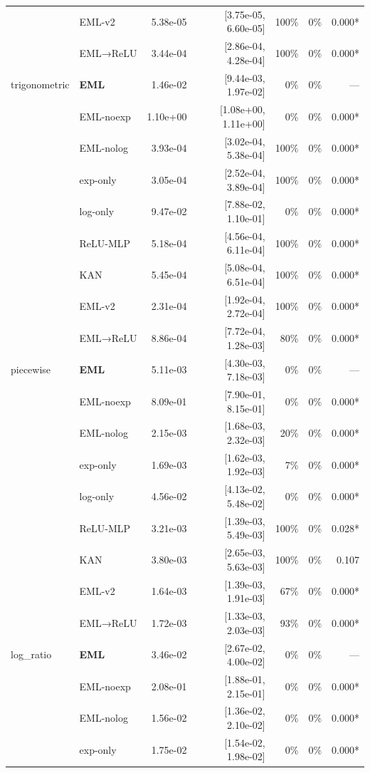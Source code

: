 \begin{table}[t]
\begin{tabular}{llrrrrr}
 & EML-v2 & 5.38e-05 & [3.75e-05, 6.60e-05] & 100\% & 0\% & 0.000* \\
 & EML→ReLU & 3.44e-04 & [2.86e-04, 4.28e-04] & 100\% & 0\% & 0.000* \\
\midrule
trigonometric & \textbf{EML} & 1.46e-02 & [9.44e-03, 1.97e-02] & 0\% & 0\% & — \\
 & EML-noexp & 1.10e+00 & [1.08e+00, 1.11e+00] & 0\% & 0\% & 0.000* \\
 & EML-nolog & 3.93e-04 & [3.02e-04, 5.38e-04] & 100\% & 0\% & 0.000* \\
 & exp-only & 3.05e-04 & [2.52e-04, 3.89e-04] & 100\% & 0\% & 0.000* \\
 & log-only & 9.47e-02 & [7.88e-02, 1.10e-01] & 0\% & 0\% & 0.000* \\
 & ReLU-MLP & 5.18e-04 & [4.56e-04, 6.11e-04] & 100\% & 0\% & 0.000* \\
 & KAN & 5.45e-04 & [5.08e-04, 6.51e-04] & 100\% & 0\% & 0.000* \\
 & EML-v2 & 2.31e-04 & [1.92e-04, 2.72e-04] & 100\% & 0\% & 0.000* \\
 & EML→ReLU & 8.86e-04 & [7.72e-04, 1.28e-03] & 80\% & 0\% & 0.000* \\
\midrule
piecewise & \textbf{EML} & 5.11e-03 & [4.30e-03, 7.18e-03] & 0\% & 0\% & — \\
 & EML-noexp & 8.09e-01 & [7.90e-01, 8.15e-01] & 0\% & 0\% & 0.000* \\
 & EML-nolog & 2.15e-03 & [1.68e-03, 2.32e-03] & 20\% & 0\% & 0.000* \\
 & exp-only & 1.69e-03 & [1.62e-03, 1.92e-03] & 7\% & 0\% & 0.000* \\
 & log-only & 4.56e-02 & [4.13e-02, 5.48e-02] & 0\% & 0\% & 0.000* \\
 & ReLU-MLP & 3.21e-03 & [1.39e-03, 5.49e-03] & 100\% & 0\% & 0.028* \\
 & KAN & 3.80e-03 & [2.65e-03, 5.63e-03] & 100\% & 0\% & 0.107 \\
 & EML-v2 & 1.64e-03 & [1.39e-03, 1.91e-03] & 67\% & 0\% & 0.000* \\
 & EML→ReLU & 1.72e-03 & [1.33e-03, 2.03e-03] & 93\% & 0\% & 0.000* \\
\midrule
log\_ratio & \textbf{EML} & 3.46e-02 & [2.67e-02, 4.00e-02] & 0\% & 0\% & — \\
 & EML-noexp & 2.08e-01 & [1.88e-01, 2.15e-01] & 0\% & 0\% & 0.000* \\
 & EML-nolog & 1.56e-02 & [1.36e-02, 2.10e-02] & 0\% & 0\% & 0.000* \\
 & exp-only & 1.75e-02 & [1.54e-02, 1.98e-02] & 0\% & 0\% & 0.000* \\

\end{tabular}
\end{table}
